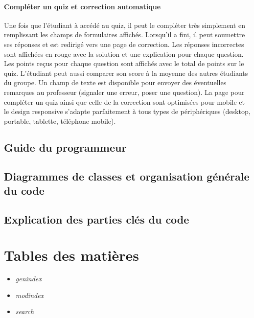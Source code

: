 \documentclass[letterpaper,10pt,french]{sphinxmanual}
\begin{document}
\subsubsection{Compléter un quiz et correction automatique}
\label{documentation:completer-un-quiz-et-correction-automatique}
Une fois que l'étudiant à accédé au quiz, il peut le compléter très simplement en remplissant les champs de formulaires affichés. Lorsqu'il a fini, il peut soumettre ses réponses et est redirigé vers une page de correction. Les réponses incorrectes sont affichées en rouge avec la solution et une explication pour chaque question. Les points reçus pour chaque question sont affichés avec le total de points sur le quiz. L'étudiant peut aussi comparer son score à la moyenne des autres étudiants du groupe. Un champ de texte est disponible pour envoyer des éventuelles remarques au professeur (signaler une erreur, poser une question). La page pour compléter un quiz ainsi que celle de la correction sont optimisées pour mobile et le design responsive s'adapte parfaitement à tous types de périphériques (desktop, portable, tablette, téléphone mobile).


\section{Guide du programmeur}
\label{documentation:guide-du-programmeur}

\section{Diagrammes de classes et organisation générale du code}
\label{documentation:diagrammes-de-classes-et-organisation-generale-du-code}

\section{Explication des parties clés du code}
\label{documentation:explication-des-parties-cles-du-code}

\chapter{Tables des matières}
\label{index:tables-des-matieres}\begin{itemize}
\item {} 
\emph{genindex}

\item {} 
\emph{modindex}

\item {} 
\emph{search}

\end{itemize}



\renewcommand{\indexname}{Index}
\printindex
\end{document}
